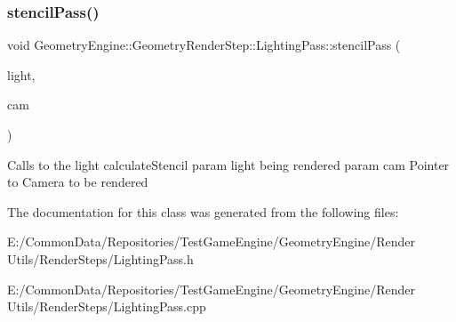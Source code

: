 \subsubsection{\texorpdfstring{stencilPass()}{stencilPass()}}
{\footnotesize\ttfamily void Geometry\+Engine\+::\+Geometry\+Render\+Step\+::\+Lighting\+Pass\+::stencil\+Pass (\begin{DoxyParamCaption}\item[{\mbox{\hyperlink{class_geometry_engine_1_1_geometry_world_item_1_1_geometry_light_1_1_light}{Geometry\+World\+Item\+::\+Geometry\+Light\+::\+Light}} $\ast$}]{light,  }\item[{\mbox{\hyperlink{class_geometry_engine_1_1_geometry_world_item_1_1_geometry_camera_1_1_camera}{Geometry\+World\+Item\+::\+Geometry\+Camera\+::\+Camera}} $\ast$}]{cam }\end{DoxyParamCaption})\hspace{0.3cm}{\ttfamily [protected]}}

Calls to the light calculate\+Stencil param light being rendered param cam Pointer to Camera to be rendered 

The documentation for this class was generated from the following files\+:\begin{DoxyCompactItemize}
\item 
E\+:/\+Common\+Data/\+Repositories/\+Test\+Game\+Engine/\+Geometry\+Engine/\+Render Utils/\+Render\+Steps/Lighting\+Pass.\+h\item 
E\+:/\+Common\+Data/\+Repositories/\+Test\+Game\+Engine/\+Geometry\+Engine/\+Render Utils/\+Render\+Steps/Lighting\+Pass.\+cpp\end{DoxyCompactItemize}

